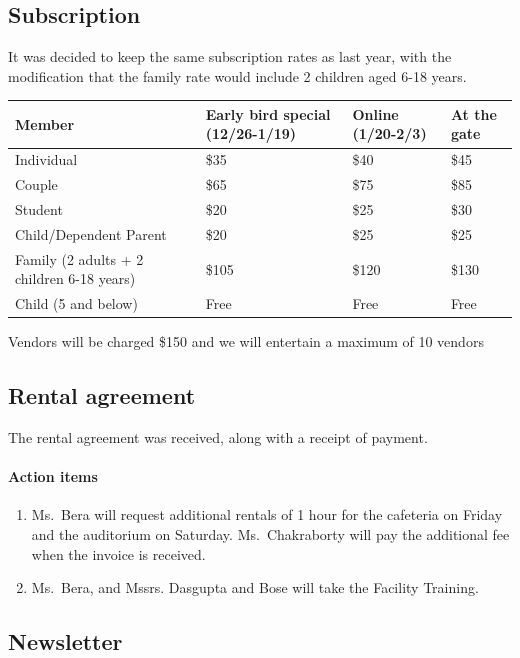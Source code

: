 \documentclass[12pt,]{article}
\providecommand{\tightlist}{%
  \setlength{\itemsep}{0pt}\setlength{\parskip}{0pt}}
\let\oldparagraph\paragraph
\renewcommand{\paragraph}[1]{\oldparagraph{#1}\mbox{}}
\begin{document}
\hypertarget{subscription}{%
\subsection{Subscription}\label{subscription}}

It was decided to keep the same subscription rates as last year, with
the modification that the family rate would include 2 children aged 6-18
years.

\begin{longtable}[]{@{}llll@{}}
\toprule
Member & Early bird special (12/26-1/19) & Online (1/20-2/3) & At the
gate\tabularnewline
\midrule
\endhead
Individual & \$35 & \$40 & \$45\tabularnewline
Couple & \$65 & \$75 & \$85\tabularnewline
Student & \$20 & \$25 & \$30\tabularnewline
Child/Dependent Parent & \$20 & \$25 & \$25\tabularnewline
Family (2 adults + 2 children 6-18 years) & \$105 & \$120 &
\$130\tabularnewline
Child (5 and below) & Free & Free & Free\tabularnewline
\bottomrule
\end{longtable}

Vendors will be charged \$150 and we will entertain a maximum of 10
vendors

\hypertarget{rental-agreement}{%
\subsection{Rental agreement}\label{rental-agreement}}

The rental agreement was received, along with a receipt of payment.

\hypertarget{action-items-4}{%
\paragraph{Action items}\label{action-items-4}}

\begin{enumerate}
\def\labelenumi{\arabic{enumi}.}
\tightlist
\item
  Ms.~Bera will request additional rentals of 1 hour for the cafeteria
  on Friday and the auditorium on Saturday. Ms.~Chakraborty will pay the
  additional fee when the invoice is received.
\item
  Ms.~Bera, and Mssrs. Dasgupta and Bose will take the Facility
  Training.
\end{enumerate}

\hypertarget{newsletter}{%
\subsection{Newsletter}\label{newsletter}}
\end{document}
